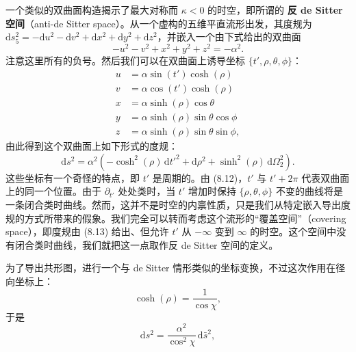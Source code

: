 一个类似的双曲面构造揭示了最大对称而 $\kappa<0$ 的时空，即所谓的 \textbf{反 de Sitter 空间}（anti-de Sitter space）。从一个虚构的五维平直流形出发，其度规为 $\mathrm{d}s_5^2 = -\mathrm{d}u^2 - \mathrm{d}v^2 + \mathrm{d}x^2 + \mathrm{d}y^2 + \mathrm{d}z^2$，并嵌入一个由下式给出的双曲面
\begin{equation*}
-u^2 - v^2 + x^2 + y^2 + z^2 = -\alpha^2.
\tag{8.11}
\end{equation*}
注意这里所有的负号。然后我们可以在双曲面上诱导坐标 $\{t',\rho,\theta,\phi\}$：
\begin{equation*}
\begin{aligned}
u &= \alpha\sin(t')\cosh(\rho)\\
v &= \alpha\cos(t')\cosh(\rho)\\
x &= \alpha\sinh(\rho)\cos\theta\\
y &= \alpha\sinh(\rho)\sin\theta\cos\phi\\
z &= \alpha\sinh(\rho)\sin\theta\sin\phi,
\end{aligned}
\tag{8.12}
\end{equation*}
由此得到这个双曲面上如下形式的度规：
\begin{equation*}
\mathrm{d}s^2 = \alpha^2\left(-\cosh^2(\rho)\,\mathrm{d}t'^2 + \mathrm{d}\rho^2 + \sinh^2(\rho)\,\mathrm{d}\Omega_2^2\right).
\tag{8.13}
\end{equation*}
这些坐标有一个奇怪的特点，即 $t'$ 是周期的。由 (8.12)，$t'$ 与 $t'+2\pi$ 代表双曲面上的同一个位置。由于 $\partial_{t'}$ 处处类时，当 $t'$ 增加时保持 $\{\rho,\theta,\phi\}$ 不变的曲线将是一条闭合类时曲线。然而，这并不是时空的内禀性质，只是我们从特定嵌入导出度规的方式所带来的假象。我们完全可以转而考虑这个流形的“覆盖空间”（covering space），即度规由 (8.13) 给出、但允许 $t'$ 从 $-\infty$ 变到 $\infty$ 的时空。这个空间中没有闭合类时曲线，我们就把这一点取作反 de Sitter 空间的定义。

为了导出共形图，进行一个与 de Sitter 情形类似的坐标变换，不过这次作用在径向坐标上：
\begin{equation*}
\cosh(\rho) = \frac{1}{\cos\chi},
\tag{8.14}
\end{equation*}
于是
\begin{equation*}
\mathrm{d}s^2 = \frac{\alpha^2}{\cos^2\chi}\,\mathrm{d}\bar{s}^2,
\tag{8.15}
\end{equation*}


